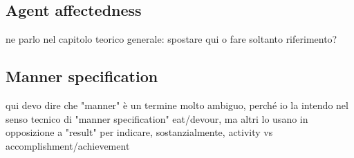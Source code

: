


\subsection{Agent affectedness} 

ne parlo nel capitolo teorico generale: spostare qui o fare soltanto riferimento?

\subsection{Manner specification} 

qui devo dire che "manner" è un termine molto ambiguo, perché io la intendo nel senso tecnico di "manner specification" eat/devour, ma altri lo usano in opposizione a "result" per indicare, sostanzialmente, activity vs accomplishment/achievement



